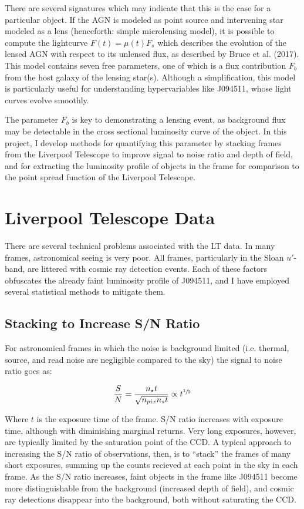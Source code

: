 \documentclass[a4paper,11pt]{article}
\begin{document}
 There are several signatures which may indicate that this is the case for a particular object. If the AGN is modeled as point source and intervening star modeled as a lens (henceforth: simple microlensing model), it is possible to compute the lightcurve $F(t) = \mu(t)F_s$ which describes the evolution of the lensed AGN with respect to its unlensed flux, as described by Bruce et al. (2017). This model contains seven free parameters, one of which is a flux contribution $F_b$ from the host galaxy of the lensing star(s). Although a simplification, this model is particularly useful for understanding hypervariables like J094511, whose light curves evolve smoothly.\cite{bruce_2017}

 The parameter $F_b$ is key to demonstrating a lensing event, as background flux may be detectable in the cross sectional luminosity curve of the object. In this project, I develop methods for quantifying this parameter by stacking frames from the Liverpool Telescope to improve signal to noise ratio and depth of field, and for extracting the luminosity profile of objects in the frame for comparison to the point spread function of the Liverpool Telescope.

\section{Liverpool Telescope Data}

There are several technical problems associated with the LT data. In many frames, astronomical seeing is very poor. All frames, particularly in the Sloan $u'$-band, are littered with cosmic ray detection events. Each of these factors obfuscates the already faint luminosity profile of J094511, and I have employed several statistical methods to mitigate them.

\subsection{Stacking to Increase S/N Ratio}

For astronomical frames in which the noise is background limited (i.e. thermal, source, and read noise are negligible compared to the sky) the signal to noise ratio goes as\cite{lawrence_2014}\cite{mcclure_2019}:

\begin{equation}
    \frac{S}{N} = \frac{n_\star t}{\sqrt{n_{pix}n_st}} \propto t^{\sfrac{1}{2}}
\end{equation}

Where $t$ is the exposure time of the frame. S/N ratio increases with exposure time, although with diminishing marginal returns. Very long exposures, however, are typically limited by the saturation point of the CCD. A typical approach to increasing the S/N ratio of observations, then, is to ``stack'' the frames of many short exposures, summing up the counts recieved at each point in the sky in each frame.\cite{mcclure_2019} As the S/N ratio increases, faint objects in the frame like J094511 become more distinguishable from the background (increased depth of field), and cosmic ray detections disappear into the background, both without saturating the CCD.
\end{document}
